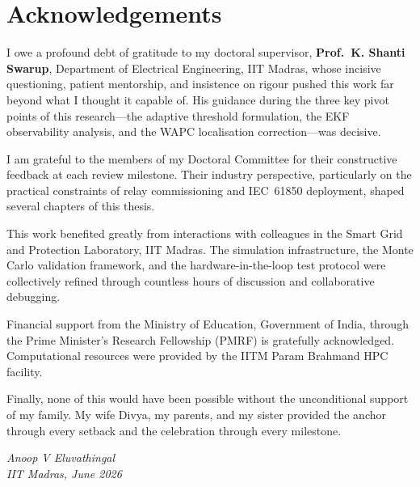 \chapter*{Acknowledgements}

I owe a profound debt of gratitude to my doctoral supervisor,
\textbf{Prof.\ K. Shanti Swarup}, Department of Electrical Engineering,
IIT Madras, whose incisive questioning, patient mentorship, and insistence
on rigour pushed this work far beyond what I thought it capable of.
His guidance during the three key pivot points of this research---the
adaptive threshold formulation, the EKF observability analysis, and the
WAPC localisation correction---was decisive.

I am grateful to the members of my Doctoral Committee for their
constructive feedback at each review milestone. Their industry perspective,
particularly on the practical constraints of relay commissioning and
IEC~61850 deployment, shaped several chapters of this thesis.

This work benefited greatly from interactions with colleagues in the
Smart Grid and Protection Laboratory, IIT Madras. The simulation
infrastructure, the Monte Carlo validation framework, and the
hardware-in-the-loop test protocol were collectively refined through
countless hours of discussion and collaborative debugging.

Financial support from the Ministry of Education, Government of India,
through the Prime Minister's Research Fellowship (PMRF) is gratefully
acknowledged. Computational resources were provided by the IITM Param
Brahmand HPC facility.

Finally, none of this would have been possible without the unconditional
support of my family. My wife Divya, my parents, and my sister provided
the anchor through every setback and the celebration through every milestone.

\medskip
\raggedleft
\textit{Anoop V Eluvathingal}\\
\textit{IIT Madras, June 2026}
